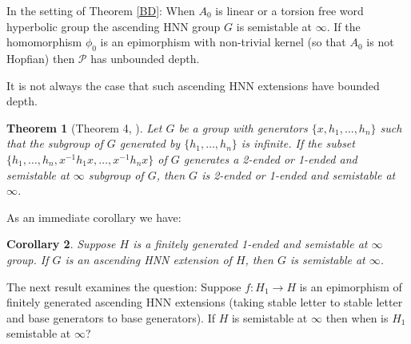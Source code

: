 \documentclass[12pt]{article}
\newtheorem{theorem}{Theorem}[subsection]
\newtheorem{corollary}[theorem]{Corollary}
\begin{document}
In the setting of Theorem \ref{BD}: When $A_0$ is linear or a torsion free word hyperbolic group the ascending HNN group $G$ is semistable at $\infty$. If the homomorphism $\phi_0$ is an epimorphism with non-trivial kernel (so that $A_0$ is not Hopfian) then $\mathcal P$ has unbounded depth.

It is not always the case that such ascending HNN extensions have bounded depth.  
 
\begin{theorem} [Theorem 4, \cite{M4}] \label{BaseSS} 
Let $G$ be a group with generators $\{x, h_1,\ldots, h_n\}$ such that the subgroup of $G$ generated by $\{h_1,\ldots, h_n\}$ is infinite. If the subset  $\{h_1,\ldots, h_n,x^{-1}h_1x,\ldots, x^{-1}h_nx\}$ of $G$ generates a 2-ended or 1-ended and semistable at $\infty$ subgroup of $G$, then $G$ is 2-ended or 1-ended and semistable at $\infty$. 
\end{theorem}

As an immediate corollary we have:

\begin{corollary} \label{BaseSS2}  
Suppose $H$ is a finitely generated 1-ended and semistable at $\infty$ group. If $G$ is an ascending HNN extension of $H$, then $G$ is semistable at $\infty$. 
\end{corollary} 
The next result examines the question: Suppose $f:H_1\to H$ is an epimorphism of finitely generated ascending HNN extensions (taking stable letter to stable letter and base generators to base generators). If $H$ is semistable at $\infty$ then when is $H_1$ semistable at $\infty$? 
\end{document}
